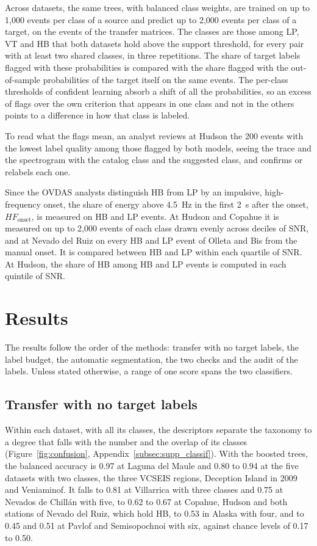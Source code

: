 \documentclass[pdflatex,sn-mathphys-num]{sn-jnl}
\begin{document}
Across datasets, the same trees, with balanced class weights, are trained
on up to 1{,}000 events per class of a source and predict up to 2{,}000
events per class of a target, on the events of the transfer matrices. The
classes are those among LP, VT and HB that both datasets hold above the
support threshold, for every pair with at least two shared classes, in
three repetitions. The share of target labels flagged with these
probabilities is compared with the share flagged with the out-of-sample
probabilities of the target itself on the same events. The per-class
thresholds of confident learning absorb a shift of all the probabilities,
so an excess of flags over the own criterion that appears in one class and
not in the others points to a difference in how that class is labeled.

To read what the flags mean, an analyst reviews at Hudson the 200 events
with the lowest label quality
among those flagged by both models, seeing the trace and the spectrogram with
the catalog class and the suggested class, and confirms or relabels each one.

Since the OVDAS analysts distinguish HB from LP by an impulsive,
high-frequency onset, the share of energy above 4.5~Hz in the first 2~s
after the onset, $HF_{\text{onset}}$, is measured on HB and LP events. At
Hudson and Copahue it is measured on up to 2{,}000 events of each class
drawn evenly across deciles of SNR, and at Nevado del Ruiz on every HB and
LP event of Olleta and Bis from the manual onset. It is compared between HB
and LP within each quartile of SNR. At Hudson, the share of HB among HB and
LP events is computed in each quintile of SNR.

\section{Results}\label{sec:results}

The results follow the order of the methods: transfer with no target labels,
the label budget, the automatic segmentation, the two checks and the audit of
the labels. Unless stated otherwise, a range of one score spans the two
classifiers.

\subsection{Transfer with no target labels}\label{subsec:res_transfer}

Within each dataset, with all its classes, the descriptors separate the
taxonomy to a degree that falls with the number and the overlap of its
classes (Figure~\ref{fig:confusion}, Appendix~\ref{subsec:supp_classif}). With the boosted trees, the balanced accuracy is 0.97 at Laguna del Maule
and 0.80 to 0.94 at the five datasets with two classes, the three VCSEIS
regions, Deception Island in 2009 and Veniaminof. It falls to 0.81 at
Villarrica with three classes and 0.75 at Nevados de Chill\'an with five, to
0.62 to 0.67 at Copahue, Hudson and both stations of Nevado del Ruiz, which
hold HB, to 0.53 in Alaska with four, and to 0.45 and 0.51 at Pavlof and
Semisopochnoi with six, against chance levels of 0.17 to 0.50.
\end{document}
